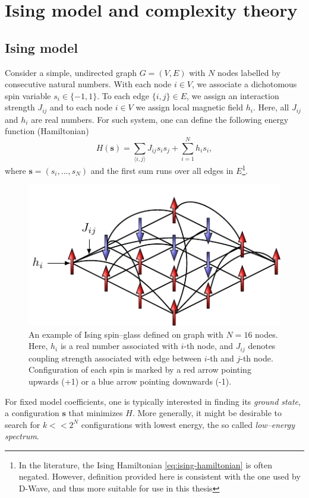 \chapter{Ising model and complexity theory}

\section{Ising model}
Consider a simple, undirected graph $G = (V, E)$ with $N$ nodes labelled by consecutive natural numbers. With each node $i \in V$, we associate a dichotomous spin variable $s_i \in \{-1, 1\}$. To each edge $\{i, j\} \in E$, we assign an interaction strength $J_{ij}$ and to each node $i \in V$ we assign local magnetic field $h_i$. Here, all $J_{ij}$ and $h_i$ are real numbers. For such system, one can define the following energy function (Hamiltonian)
\begin{equation}
\label{eq:ising-hamiltonian}
H(\mathbf{s}) = \sum_{\langle i, j \rangle} J_{ij} s_i s_j +  \sum_{i=1}^N h_i s_i,
\end{equation}
where $\mathbf{s} = (s_i, \ldots, s_N)$ and the first sum runs over all edges in $E$\footnote{In the literature, the Ising Hamiltonian \eqref{eq:ising-hamiltonian} is often negated. However, definition provided here is consistent with the one used by D-Wave, and thus more suitable for use in this thesis}.
\begin{figure}
    \centering
    \includegraphics{figures/spins.pdf}
    \caption{An example of Ising  spin--glass defined on graph with $N=16$ nodes. Here, $h_i$ is a real number associated with $i$-th node, and $J_{ij}$ denotes coupling strength associated with edge between $i$-th and $j$-th node. Configuration of each spin is marked by a red arrow pointing upwards (+1) or a blue arrow pointing downwards (-1).}
    \label{fig:my_label}
\end{figure}
For fixed model coefficients, one is typically interested in finding its \emph{ground state}, a configuration $\mathbf{s}$ that minimizes $H$. More generally, it might be desirable to search for $k << 2^N$ configurations with lowest energy, the so called \emph{low--energy spectrum}.

